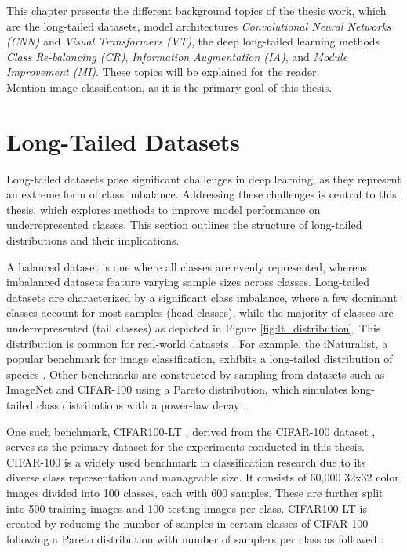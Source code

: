 

This chapter presents the different background topics of the thesis work, which are the long-tailed datasets, model architectures \textit{Convolutional Neural Networks (CNN)} and \textit{Visual Transformers (VT)}, the deep long-tailed learning methods \textit{Class Re-balancing (CR)}, \textit{Information Augmentation (IA)}, 
and \textit{Module Improvement (MI)}. These topics will be explained for the reader.\\

Mention image classification, as it is the primary goal of this thesis. 

\section{Long-Tailed Datasets}
Long-tailed datasets pose significant challenges in deep learning, as they represent an extreme form of class imbalance. Addressing these challenges is central to this thesis, which explores methods to improve model performance on underrepresented classes. This section outlines the structure of long-tailed distributions and their implications.

A balanced dataset is one where all classes are evenly represented, whereas imbalanced datasets feature varying sample sizes across classes. Long-tailed datasets are characterized by a significant class imbalance, where a few dominant classes account for most samples (head classes), while the majority of classes are underrepresented (tail classes) as depicted in Figure \ref{fig:lt_distribution}. This  distribution is common for real-world datasets \cite{Newman_2005, liu2019largescalelongtailedrecognitionopen}. For example, the iNaturalist, a popular benchmark for image classification, exhibits a long-tailed distribution of species \cite{vanhorn2018inaturalistspeciesclassificationdetection}. Other benchmarks are constructed by sampling from datasets such as ImageNet \cite{ImageNet2009} and CIFAR-100 \cite{krizhevsky2009learning} using a Pareto distribution, which simulates long-tailed class distributions with a power-law decay \cite{zhang2023deep, dealvis2024surveydeeplongtailclassification,cao2019learningimbalanceddatasetslabeldistributionaware}.

One such benchmark, CIFAR100-LT \cite{cao2019learningimbalanceddatasetslabeldistributionaware}, derived from the CIFAR-100 dataset \cite{krizhevsky2009learning}, serves as the primary dataset for the experiments conducted in this thesis. CIFAR-100 is a widely used benchmark in classification research due to its diverse class representation and manageable size. It consists of 60,000 32x32 color images divided into 100 classes, each with 600 samples. These are further split into 500 training images and 100 testing images per class. CIFAR100-LT is created by reducing the number of samples in certain classes of CIFAR-100 following a Pareto distribution with number of samplers per class as followed \cite{kaidic_ldam_drw}:

